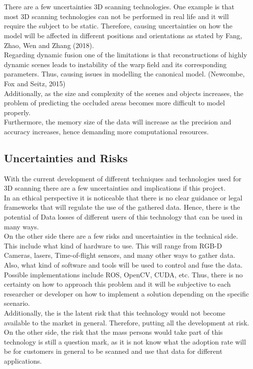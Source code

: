 \documentclass[a4paper]{article}
\begin{document}
\section*{}
There are a few uncertainties 3D scanning technologies. One example is that most 3D scanning technologies can not be performed in real life and it will require the subject to be static. Therefore, causing uncertainties on how the model will be affected in different positions and orientations as stated by Fang, Zhao, Wen and Zhang (2018).\\
Regarding dynamic fusion one of the limitations is that reconstructions of highly dynamic scenes leads to instability of the warp field and its corresponding parameters. Thus, causing issues in modelling the canonical model.  (Newcombe, Fox and Seitz, 2015)\\
Additionally, as the size and complexity of the scenes and objects increases, the problem of predicting the occluded areas becomes more difficult to model properly. \\
Furthermore, the memory size of the data will increase as the precision and accuracy increases, hence demanding more computational resources. 
\subsection*{Uncertainties and Risks}
With the current development of different techniques and technologies used for 3D scanning there are a few uncertainties and implications if this project. \\[10pt]
In an ethical perspective it is noticeable that there is no clear guidance or legal frameworks that will regulate the use of the gathered data. Hence, there is the potential of Data losses of different users of this technology that can be used in many ways. \\[10pt]
On the other side there are a few risks and uncertainties in the technical side. This include what kind of hardware to use. This will range from RGB-D Cameras, lasers, Time-of-flight sensors, and many other ways to gather data. Also, what kind of software and tools will be used to control and fuse the data.
 Possible implementations include ROS, OpenCV, CUDA, etc. Thus, there is no certainty on how to approach this problem and it will be subjective to each researcher or developer on how to implement a solution depending on the specific scenario. \\ [10pt]
Additionally, the is the latent risk that this technology would not become available to the market in general. Therefore, putting all the development at risk. On the other side, the risk that the mass persons would take part of this technology is still a question mark, as it is not know what the adoption rate will be for customers in general to be scanned and use that data for different applications. 

\newpage


\nocite{*}   %

\end{document}

